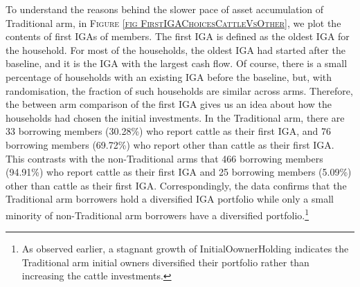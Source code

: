 	To understand the reasons behind the slower pace of asset accumulation of \textsf{Traditional} arm,
in \textsc{\footnotesize Figure \ref{fig FirstIGAChoicesCattleVsOther}}, we plot the contents of first IGAs of members. The first IGA is defined as the oldest IGA for the household. For most of the households, the oldest IGA had started after the baseline, and it is the IGA with the largest cash flow. Of course, there is a small percentage of households with an existing IGA before the baseline, but, with randomisation, the fraction of such households are similar across arms. Therefore, the between arm comparison of the first IGA gives us an idea about how the households had chosen the initial investments. 
In the \textsf{Traditional} arm, there are 33 borrowing members (30.28\%) who report cattle as their first IGA, and 76 borrowing members (69.72\%) who report other than cattle as their first IGA. 
This contrasts with the non-\textsf{Traditional} arms that 466 borrowing members (94.91\%)
who report cattle as their first IGA and 25 borrowing members (5.09\%) other than cattle as their first IGA. 
Correspondingly, the data confirms that the \textsf{Traditional} arm borrowers hold a diversified IGA portfolio while only a small minority of non-\textsf{Traditional} arm borrowers have a diversified portfolio.\footnote{As observed earlier, a stagnant growth of \textsf{InitialOownerHolding} indicates the \textsf{Traditional} arm initial owners diversified their portfolio rather than increasing the cattle investments. }


